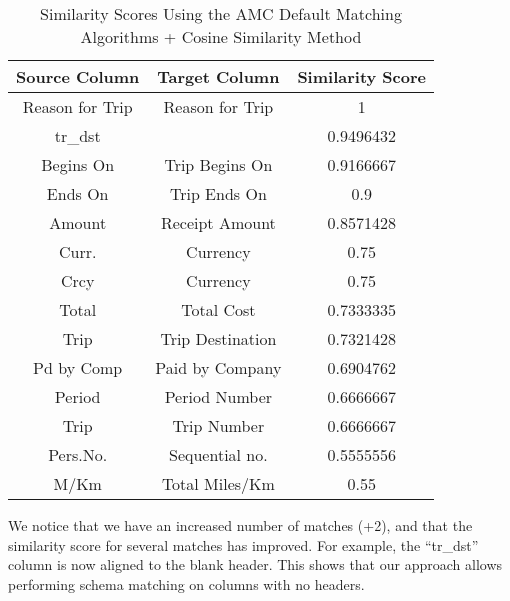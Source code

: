 \begin{table}[ht]
\centering
\begin{tabular}{|c|c|c|} \hline
\textbf{Source Column} & \textbf{Target Column} & \textbf{Similarity Score} \\ \hline
Reason for Trip & Reason for Trip & 1 \\ \hline
tr\_dst &  & 0.9496432 \\ \hline
Begins On & Trip Begins On & 0.9166667 \\ \hline
Ends On & Trip Ends On & 0.9 \\ \hline
Amount & Receipt Amount & 0.8571428 \\ \hline
Curr. & Currency & 0.75 \\ \hline
Crcy & Currency & 0.75 \\ \hline
Total & Total Cost & 0.7333335 \\ \hline
Trip & Trip Destination & 0.7321428 \\ \hline
Pd by Comp & Paid by Company & 0.6904762 \\ \hline
Period & Period Number & 0.6666667 \\ \hline
Trip & Trip Number & 0.6666667 \\ \hline
Pers.No. & Sequential no. & 0.5555556 \\ \hline
M/Km & Total Miles/Km & 0.55 \\ \hline
\end{tabular}
\caption{Similarity Scores Using the AMC Default Matching Algorithms + Cosine Similarity Method}
\label{tab:Similarity_Scores_Using_the_AMC_Default_Matching_Algorithms_+_Cosine_Similarity_Method}
\end{table}


We notice that we have an increased number of matches (+2), and that the similarity score for several matches has improved. For example, the ``tr\_dst'' column is now aligned to the blank header. This shows that our approach allows performing schema matching on columns with no headers.

